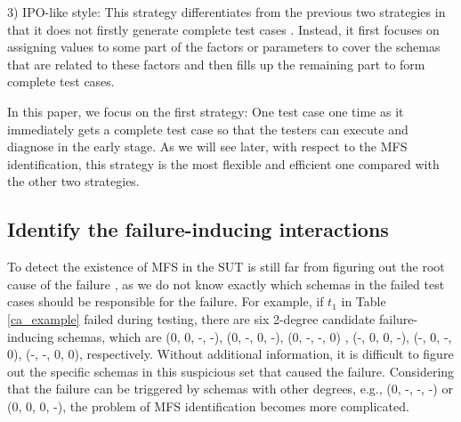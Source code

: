 \documentclass[journal,12pt,onecolumn,draftclsnofoot,]{IEEEtran}
\begin{document}
3) IPO-like style:  This strategy differentiates from the previous two strategies in that it does not firstly generate complete test cases \cite{lei2008ipog}. Instead, it first focuses on assigning values to some part of the factors or parameters to cover the schemas that are related to these factors and then fills up the remaining part to form complete test cases.

In this paper, we focus on the first strategy: One test case one time as it immediately gets a complete test case so that the testers can execute and diagnose in the early stage. As we will see later, with respect to the MFS identification, this strategy is the most flexible and efficient one compared with the other two strategies.

%

%
%
%


\subsection{Identify the failure-inducing interactions}\label{sec:back:iden}
To detect the existence of MFS in the SUT is still far from figuring out the root cause of the failure \cite{colbourn2008locating,martinez2008algorithms,martinez2009locating}, as we do not know exactly which schemas in the failed test cases should be responsible for the failure. For example, if $t_{1}$ in Table \ref{ca_example} failed during testing, there are six 2-degree candidate failure-inducing schemas, which are (0, 0, -, -), (0, -, 0, -), (0, -, -, 0) , (-, 0, 0, -), (-, 0, -, 0), (-, -, 0, 0), respectively. Without
additional information, it is difficult to figure out the specific schemas in this suspicious set that caused the failure. Considering that the failure can be triggered by schemas with other degrees, e.g., (0, -, -, -) or (0, 0, 0, -), the problem of MFS identification becomes more complicated.
\end{document}
